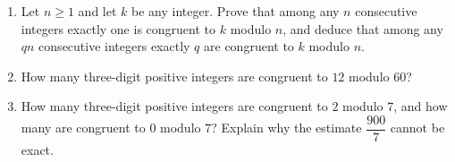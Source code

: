 \begin{enumerate}
\item[(a)] Let $n\ge1$ and let $k$ be any integer. Prove that among any $n$ consecutive integers exactly one is congruent to $k$ modulo $n$, and deduce that among any $qn$ consecutive integers exactly $q$ are congruent to $k$ modulo $n$.
\item[(b)] How many three-digit positive integers are congruent to $12$ modulo $60$?
\item[(c)] How many three-digit positive integers are congruent to $2$ modulo $7$, and how many are congruent to $0$ modulo $7$? Explain why the estimate $\dfrac{900}{7}$ cannot be exact.
\end{enumerate}
